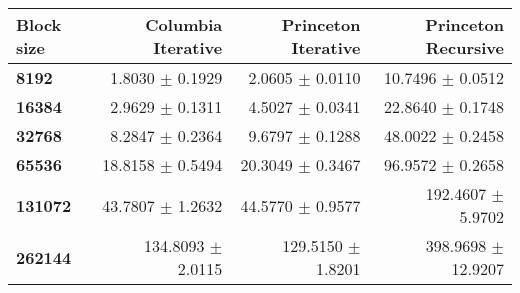 \begin{tabular}{lrrr}\toprule
\textbf{Block size}  & \textbf{Columbia Iterative} & \textbf{Princeton Iterative} & \textbf{Princeton Recursive}\\\midrule
\textbf{8192}  & 1.8030 $\pm$ 0.1929 & 2.0605 $\pm$ 0.0110 & 10.7496 $\pm$ 0.0512\\
\textbf{16384}  & 2.9629 $\pm$ 0.1311 & 4.5027 $\pm$ 0.0341 & 22.8640 $\pm$ 0.1748\\
\textbf{32768}  & 8.2847 $\pm$ 0.2364 & 9.6797 $\pm$ 0.1288 & 48.0022 $\pm$ 0.2458\\
\textbf{65536}  & 18.8158 $\pm$ 0.5494 & 20.3049 $\pm$ 0.3467 & 96.9572 $\pm$ 0.2658\\
\textbf{131072}  & 43.7807 $\pm$ 1.2632 & 44.5770 $\pm$ 0.9577 & 192.4607 $\pm$ 5.9702\\
\textbf{262144} & 134.8093 $\pm$ 2.0115 & 129.5150 $\pm$ 1.8201 & 398.9698 $\pm$ 12.9207\\
\bottomrule
\end{tabular}
